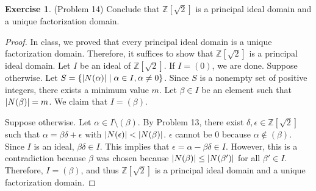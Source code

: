 \documentclass[12pt, psamsfonts]{amsart}
\theoremstyle{definition}
\newtheorem*{exer}{Exercise}
\theoremstyle{remark}
\numberwithin{equation}{section}
\begin{document}
\begin{exer}{(Problem 14)}
  Conclude that $\mathbb{Z}[\sqrt{2}]$ is a principal ideal domain and a unique factorization domain.
\end{exer}

\begin{proof}
  In class, we proved that every principal ideal domain is a unique factorization domain.
  Therefore, it suffices to show that $\mathbb{Z}[\sqrt{2}]$ is a principal ideal domain.
  Let $I$ be an ideal of $\mathbb{Z}[\sqrt{2}]$.
  If $I = (0)$, we are done.
  Suppose otherwise.
  Let $S = \{ \abs{N(\alpha)} \mid \alpha \in I, \alpha \ne 0 \}$.
  Since $S$ is a nonempty set of positive integers, there exists a minimum value $m$.
  Let $\beta \in I$ be an element such that $\abs{N(\beta)} = m$.
  We claim that $I = (\beta)$.

  Suppose otherwise.
  Let $\alpha \in I \setminus (\beta)$.
  By Problem 13, there exist $\delta, \epsilon \in \mathbb{Z}[\sqrt{2}]$ such that $\alpha = \beta\delta + \epsilon$ with $\abs{N(\epsilon)} < \abs{N(\beta)}$.
  $\epsilon$ cannot be $0$ because $\alpha \notin (\beta)$.
  Since $I$ is an ideal, $\beta\delta \in I$.
  This implies that $\epsilon = \alpha - \beta\delta \in I$.
  However, this is a contradiction because $\beta$ was chosen because $\abs{N(\beta)} \leq \abs{N(\beta')}$ for all $\beta' \in I$.
  Therefore, $I = (\beta)$, and thus $\mathbb{Z}[\sqrt{2}]$ is a principal ideal domain and a unique factorization domain.
\end{proof}
\end{document}
